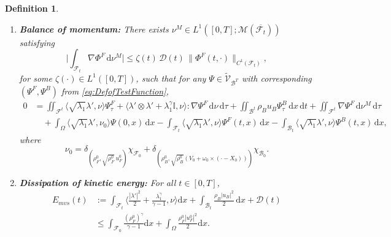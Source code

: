 \documentclass[11pt,twoside,reqno]{amsart}
\numberwithin{equation}{section}
\numberwithin{figure}{section}
\newtheorem{definition}{Definition}[section]
\begin{document}
\begin{definition}
\begin{enumerate}[(1)]
\item \textbf{Balance of momentum:}  
There exists $\nu^M \in L^1([0,T]; \mathcal{M}(\overline{\mathcal{F}_t}))$ satisfying
\begin{equation}\label{ersatzpoincare}
\Big|\int_{\mathcal{F}_t} \nabla \Phi^F \, \mathrm{d}\nu^M\Big|
\le \zeta(t)\,\mathcal{D}(t)\,\|\Phi^F(t,\cdot)\|_{C^1(\mathcal{F}_t)},
\end{equation}
for some $\zeta(\cdot) \in L^1([0,T])$, such that for any $\Psi \in \tilde{\mathcal{V}}_{\mathcal{B}^T}$ with corresponding $(\Psi^F, \Psi^B)$ from \eqref{eq:DefofTestFunction},
\begin{equation}\label{MVS MomentumC}
\begin{aligned}
0 &= \iint_{\mathcal{F}^t}
    \langle \sqrt{\lambda_1}\lambda', \nu \rangle \Psi^F_\tau
   + \langle \lambda'\otimes\lambda' + \lambda_1^\gamma \mathbb{I}, \nu \rangle
      \!:\! \nabla \Psi^F \, \mathrm{d}\nu\,\mathrm{d}\tau
   + \iint_{\mathcal{B}^t} \rho_B u_B \Psi^B_\tau \,\mathrm{d}x\,\mathrm{d}t
   + \iint_{\mathcal{F}^t} \nabla \Psi^F \, \mathrm{d}\nu^M\,\mathrm{d}\tau \\
&\quad + \int_{\Omega} \langle \sqrt{\lambda_1}\lambda', \nu_0 \rangle \Psi(0,x)\,\mathrm{d}x
 - \int_{\mathcal{F}_t} \langle \sqrt{\lambda_1}\lambda', \nu \rangle \Psi^F(t,x)\,\mathrm{d}x
 - \int_{\mathcal{B}_t} \langle \sqrt{\lambda_1}\lambda', \nu \rangle \Psi^B(t,x)\,\mathrm{d}x,
\end{aligned}
\end{equation}
where
\[
\nu_0 = \delta_{(\rho_F^0, \sqrt{\rho_F^0}\,u_F^0)} \chi_{\mathcal{F}_0}
+ \delta_{(\rho_B^0, \sqrt{\rho_B^0}(V_0 + \omega_0 \times (\cdot-X_0)))} \chi_{\mathcal{B}_0}.
\]

\item \textbf{Dissipation of kinetic energy:}  
For all $t \in [0,T]$,
\begin{equation}\label{eq:EnergyMVS}
\begin{aligned}
E_{mvs}(t)
&:= \int_{\mathcal{F}_t} \Big\langle \frac{|\lambda'|^2}{2} + \frac{\lambda_1^\gamma}{\gamma - 1}, \nu \Big\rangle \mathrm{d}x
   + \int_{\mathcal{B}_t} \frac{\rho_B |u_B|^2}{2} \, \mathrm{d}x
   + \mathcal{D}(t) \\
&\le \int_{\mathcal{F}_0} \frac{(\rho^0_F)^\gamma}{\gamma-1} \mathrm{d}x
   + \int_{\Omega} \frac{\rho_F^0 |u^0_F|^2}{2} \mathrm{d}x.
\end{aligned}
\end{equation}
\end{enumerate}
\end{definition}
\end{document}
